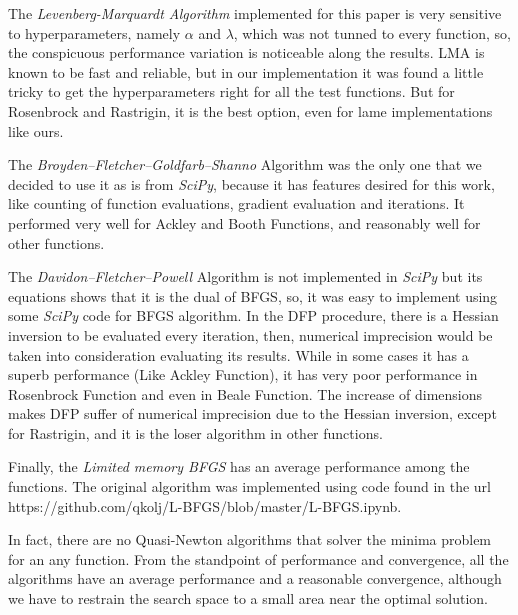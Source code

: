 \documentclass[conference]{IEEEtran}
\begin{document}
The \textit{Levenberg-Marquardt Algorithm} implemented for this paper is very sensitive to hyperparameters, namely $\alpha$ and $\lambda$, which was not tunned to every function, so, the conspicuous performance variation is noticeable along the results. LMA is known to be fast and reliable, but in our implementation it was found a little tricky to get the hyperparameters right for all the test functions. But for Rosenbrock and Rastrigin, it is the best option, even for lame implementations like ours.

The \textit{Broyden–Fletcher–Goldfarb–Shanno} Algorithm was the only one that we decided to use it as is from \textit{SciPy}, because it has features desired for this work, like counting of function evaluations, gradient evaluation and iterations. It performed very well for Ackley and Booth Functions, and reasonably well for other functions.

The \textit{Davidon–Fletcher–Powell} Algorithm is not implemented in \textit{SciPy} but its equations shows that it is the dual of BFGS, so, it was easy to implement using some \textit{SciPy} code for BFGS algorithm. In the DFP procedure, there is a Hessian inversion to be evaluated every iteration, then, numerical imprecision would be taken into consideration evaluating its results. While in some cases it has a superb performance (Like Ackley Function), it has very poor performance in Rosenbrock Function and even in Beale Function. The increase of dimensions makes DFP suffer of numerical imprecision due to the Hessian inversion, except for Rastrigin, and it is the loser algorithm in other functions.

Finally, the \textit{Limited memory BFGS} has an average performance among the functions. The original algorithm was implemented using code found in the url https://github.com/qkolj/L-BFGS/blob/master/L-BFGS.ipynb.

In fact, there are no Quasi-Newton algorithms that solver the minima problem for an any function. From the standpoint of performance and convergence, all the algorithms have an average performance and a reasonable convergence, although we have to restrain the search space to a small area near the optimal solution.
\end{document}
